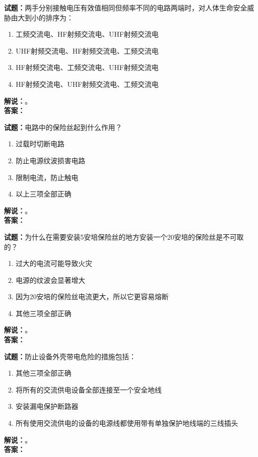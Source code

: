 \documentclass{ctexbook}
\begin{document}
\bigskip

\noindent\textbf{试题：}两手分别接触电压有效值相同但频率不同的电路两端时，对人体生命安全威胁由大到小的排序为：
\begin{enumerate}[leftmargin=3em]
  \item 工频交流电、HF射频交流电、UHF射频交流电
  \item UHF射频交流电、HF射频交流电、工频交流电
  \item HF射频交流电、工频交流电、UHF射频交流电
  \item HF射频交流电、UHF射频交流电、工频交流电
\end{enumerate}
\noindent\textbf{解说：}\textbf{}。\\\noindent\textbf{答案：}

\bigskip

\noindent\textbf{试题：}电路中的保险丝起到什么作用？
\begin{enumerate}[leftmargin=3em]
  \item 过载时切断电路
  \item 防止电源纹波损害电路
  \item 限制电流，防止触电
  \item 以上三项全部正确
\end{enumerate}
\noindent\textbf{解说：}\textbf{}。\\\noindent\textbf{答案：}

\bigskip

\noindent\textbf{试题：}为什么在需要安装5安培保险丝的地方安装一个20安培的保险丝是不可取的？
\begin{enumerate}[leftmargin=3em]
  \item 过大的电流可能导致火灾
  \item 电源的纹波会显著增大
  \item 因为20安培的保险丝电流更大，所以它更容易熔断
  \item 其他三项全部正确
\end{enumerate}
\noindent\textbf{解说：}\textbf{}。\\\noindent\textbf{答案：}

\bigskip

\noindent\textbf{试题：}防止设备外壳带电危险的措施包括：
\begin{enumerate}[leftmargin=3em]
  \item 其他三项全部正确
  \item 将所有的交流供电设备全部连接至一个安全地线
  \item 安装漏电保护断路器
  \item 所有使用交流供电的设备的电源线都使用带有单独保护地线端的三线插头
\end{enumerate}
\noindent\textbf{解说：}\textbf{}。\\\noindent\textbf{答案：}
\end{document}
